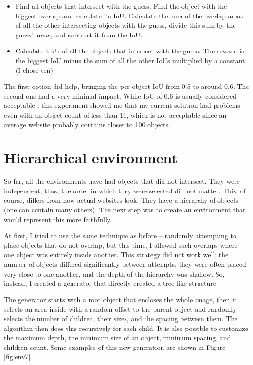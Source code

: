 \documentclass[
  digital,     %
  oneside,     %
  nosansbold,  %
  nocolorbold, %
  lof,         %
  lot,         %
]{fithesis4}
\begin{document}
\begin{itemize}
    \item Find all objects that intersect with the guess. Find the object with the biggest overlap and calculate its IoU. Calculate the sum of the overlap areas of all the other intersecting objects with the guess, divide this sum by the guess' areas, and subtract it from the IoU.
    \item Calculate IoUs of all the objects that intersect with the guess. The reward is the biggest IoU minus the sum of all the other IoUs multiplied by a constant (I chose ten).
\end{itemize}

The first option did help, bringing the per-object IoU from 0.5 to around 0.6. The second one had a very minimal impact. While IoU of 0.6 is usually considered acceptable \cite[p. 291]{DLforVisualSystems}, this experiment showed me that my current solution had problems even with an object count of less than 10, which is not acceptable since an average website probably contains closer to 100 objects.

\section{Hierarchical environment}
\label{sec:hierarchical-env}

So far, all the environments have had objects that did not intersect. They were independent; thus, the order in which they were selected did not matter. This, of course, differs from how actual websites look. They have a hierarchy of objects (one can contain many others). The next step was to create an environment that would represent this more faithfully.

At first, I tried to use the same technique as before -- randomly attempting to place objects that do not overlap, but this time, I allowed such overlaps where one object was entirely inside another. This strategy did not work well; the number of objects differed significantly between attempts, they were often placed very close to one another, and the depth of the hierarchy was shallow. So, instead, I created a generator that directly created a tree-like structure.

The generator starts with a root object that encloses the whole image, then it selects an area inside with a random offset to the parent object and randomly selects the number of children, their sizes, and the spacing between them. The algorithm then does this recursively for each child. It is also possible to customize the maximum depth, the minimum size of an object, minimum spacing, and children count. Some examples of this new generation are shown in Figure \ref{fig:env7}
\end{document}
